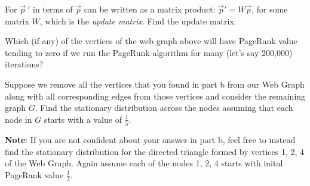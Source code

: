 \documentclass[12pt,twoside]{article}
\begin{document}
\begin{problem}{10}
\begin{problem}{10}
\bparts

 For $\vec{p}~'$ in terms of $\vec{p}$ can be written as a matrix product: $\vec{p}' = W\vec{p}$, for some matrix $W$, which is the \emph{update matrix}. Find the update matrix.

 Which (if any) of the vertices of the web graph above will have PageRank value tending to zero if we run the PageRunk algorithm for many (let's say 200,000) iterations?

 Suppose we remove all the vertices that you found in part b from our Web Graph along with all corresponding edges from those vertices and consider the remaining graph $G$.  Find the stationary distribution across the nodes assuming that each node in $G$ starts with a value of $\frac{1}{5}$.  

\textbf{Note}: If you are not confident about your answer in part b, feel free to instead find the stationary distribution for the directed triangle formed by vertices 1, 2, 4 of the Web Graph.  Again assume each of the nodes 1, 2, 4 starts with inital PageRank value $\frac{1}{3}$.  

\eparts
\end{problem}

\eparts
\end{problem}
\end{document}
